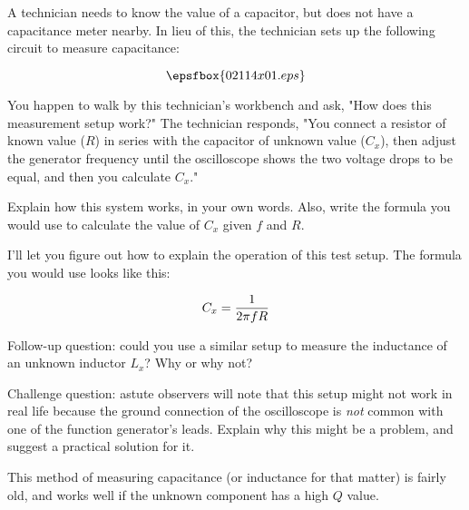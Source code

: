 

A technician needs to know the value of a capacitor, but does not have a capacitance meter nearby.  In lieu of this, the technician sets up the following circuit to measure capacitance:

$$\epsfbox{02114x01.eps}$$

You happen to walk by this technician's workbench and ask, "How does this measurement setup work?"  The technician responds, "You connect a resistor of known value ($R$) in series with the capacitor of unknown value ($C_x$), then adjust the generator frequency until the oscilloscope shows the two voltage drops to be equal, and then you calculate $C_x$."

Explain how this system works, in your own words.  Also, write the formula you would use to calculate the value of $C_x$ given $f$ and $R$.







I'll let you figure out how to explain the operation of this test setup.  The formula you would use looks like this:

$$C_x = {1 \over {2 \pi f R}}$$

\vskip 10pt

Follow-up question: could you use a similar setup to measure the inductance of an unknown inductor $L_x$?  Why or why not?  

\vskip 10pt

Challenge question: astute observers will note that this setup might not work in real life because the ground connection of the oscilloscope is {\it not} common with one of the function generator's leads.  Explain why this might be a problem, and suggest a practical solution for it.







This method of measuring capacitance (or inductance for that matter) is fairly old, and works well if the unknown component has a high $Q$ value.




